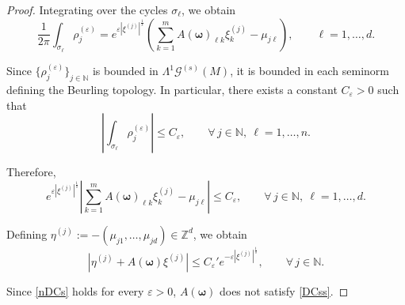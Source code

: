 \documentclass[10pt,a4paper]{amsart}
\begin{document}
\begin{proof}
	Integrating over the cycles $\sigma_\ell$,
	we obtain
	\[
	\frac{1}{2\pi} \int_{\sigma_\ell} \rho_j^{(\varepsilon)} =  	e^{\varepsilon |\xi^{(j)}|^{\frac{1}{s}}}\left( \sum_{k=1}^{m} A(\boldsymbol{\omega})_{\ell k}\xi^{(j)}_k
	- \mu_{j\ell} 	\right), 	\qquad 	\ell=1,\dots,d.
	\]
	
	Since $\{\rho_j^{(\varepsilon)}\}_{j\in\mathbb{N}}$ is bounded in  $\mathsf{\Lambda}^1 \mathscr{G}^{(s)}(M)$, it is bounded in each seminorm defining the Beurling topology. In particular, there exists a constant 
	$C_\varepsilon>0$ such that
	\[
	\left| 	\int_{\sigma_\ell} 	\rho_j^{(\varepsilon)} 	\right|
	\le 	C_\varepsilon, 	\qquad 	\forall\, j\in\mathbb{N},\  \ell=1,\dots,n.
	\]
	
	Therefore,
	\[
	e^{\varepsilon|\xi^{(j)}|^{\frac{1}{s}}} \left| \sum_{k=1}^{m} 	A(\boldsymbol{\omega})_{\ell k}\xi^{(j)}_k - \mu_{j\ell} 	\right|
	\le C_\varepsilon, 	\qquad	\forall\,j\in\mathbb{N},\ \ell=1,\dots,d.
	\]
	
	Defining $\eta^{(j)} := -(\mu_{j1},\dots,\mu_{jd})\in\mathbb{Z}^d$, 
	we obtain
	\begin{equation}\label{nDCs}
	|\eta^{(j)} + A(\boldsymbol{\omega})\xi^{(j)}| \le C_\varepsilon' e^{-\varepsilon| \xi^{(j)}|^{\frac{1}{s}}},\qquad\forall\,j\in\mathbb{N}.
	\end{equation}
	
	Since \eqref{nDCs} holds for every $\varepsilon>0$, $A(\boldsymbol{\omega})$ does not satisfy \eqref{DCss}.
	\end{proof}
\end{document}
